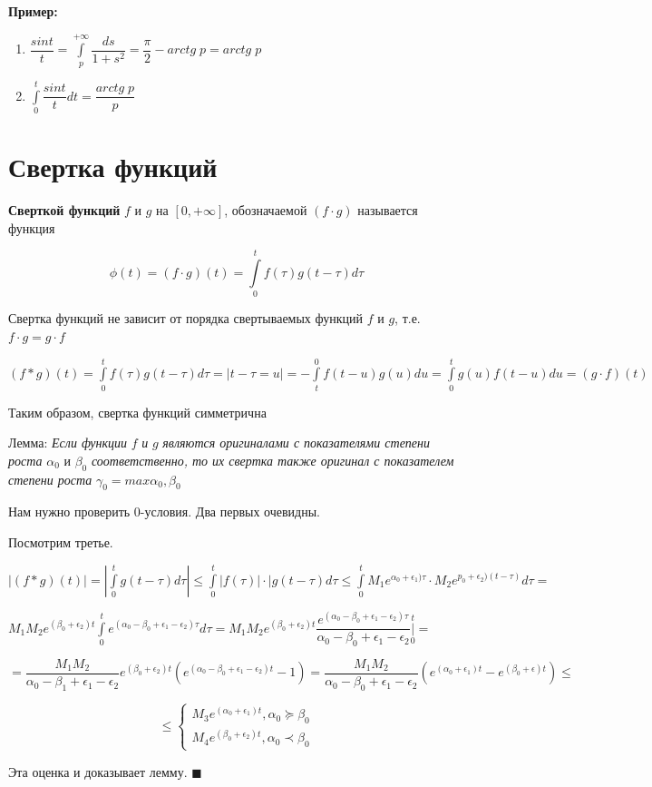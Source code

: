\documentclass[a4paper, 12pt]{report}
\newenvironment{Proof}
{\par\noindent{\bf Доказательство.}}
{\hfill$\scriptstyle\blacksquare$}
\begin{document}
\textbf{Пример:}
\begin{enumerate}
    \item $\dfrac{sint}{t}=\int\limits_{p}^{+\infty}\dfrac{ds}{1+s^2}= \dfrac{\pi}{2}-arctg\; p=arctg\; p$
    \item $\int\limits_{0}^{t}\dfrac{sint}{t}dt=\dfrac{arctg\;p}{p}$
\end{enumerate}

\section{Свертка функций}
 
\textbf{Сверткой функций} $f$ и $g$ на $[0,+\infty]$, обозначаемой $(f\cdot g)$ называется функция 

$$\phi(t)=(f\cdot g)(t)= \int\limits_{0}^{t}f(\tau)g(t-\tau)d\tau$$

Свертка функций не зависит от порядка свертываемых функций $f$ и $g$, т.е. $f\cdot g=g\cdot f$

$(f*g)(t)=\int\limits_{0}^{t}f(\tau)g(t-\tau)d\tau=|t-\tau=u|=-\int\limits_{t}^{0}f(t-u)g(u)du=\int\limits_{0}^{t}g(u)f(t-u)du=(g\cdot f)(t)$

Таким образом, свертка функций симметрична
\par\bigskip
$\textbf{Лемма:}$ \textit{Если функции} $f$ \textit{и} $g$ \textit{являются оригиналами с показателями степени роста} $\alpha_0$ и $\beta_0$ \textit{соответственно, то их свертка также оригинал с показателем степени роста} $\gamma_0=max{\alpha_0,\beta_0}$
\begin{Proof}
    Нам нужно проверить 0-условия. Два первых очевидны. \par\bigskip
    Посмотрим третье.

$|(f*g)(t)|=|\int\limits_{0}^{t}g(t-\tau)d\tau|\leq\int\limits_{0}^{t}|f(\tau)|\cdot|g(t-\tau)d\tau\leq\int\limits_{0}^{t}M_1e^{\alpha_0+\epsilon_1)\tau}\cdot M_2 e^{p_0+\epsilon_2)(t-\tau)}d\tau=$ 

$M_1M_2e^{(\beta_0+\epsilon_2)t}\int\limits_{0}^{t}e^{(\alpha_0-\beta_0+\epsilon_1-\epsilon_2)\tau}d\tau=M_1M_2e^{(\beta_0+\epsilon_2)t}\dfrac{e^{(\alpha_0-\beta_0+\epsilon_1-\epsilon_2)\tau}}{\alpha_0-\beta_0+\epsilon_1-\epsilon_2}\bigg|\limits_{0}^{t}=$ 

$=\dfrac{M_1M_2}{\alpha_0-\beta_1+\epsilon_1-\epsilon_2} e^{(\beta_0+\epsilon_2)t}(e^{(\alpha_0-\beta_0+\epsilon_1-\epsilon_2)t}-1)=\dfrac{M_1M_2}{\alpha_0-\beta_0+\epsilon_1-\epsilon_2} (e^{(\alpha_0+\epsilon_1)t}-e^{(\beta_0+\epsilon)t})\leq$

\begin{equation*}
 \leq
 \begin{cases}
  M_3e^{(\alpha_0+\epsilon_1)t},\alpha_0\succeq\beta_0\\
  M_4e^{(\beta_0+\epsilon_2)t}, \alpha_0\prec\beta_0	
 \end{cases}
\end{equation*}

Эта оценка и доказывает лемму.
\end{Proof}
\end{document}
